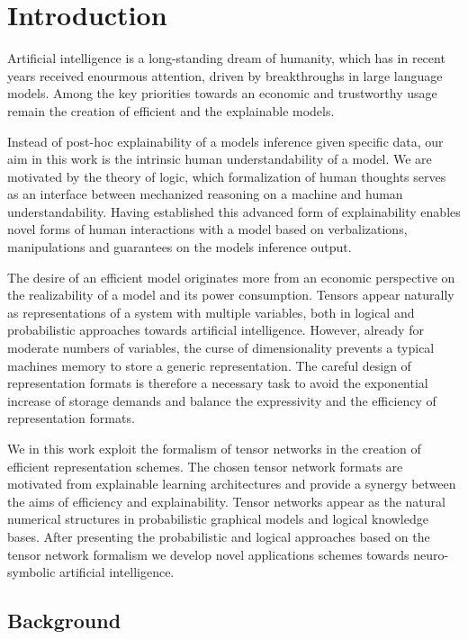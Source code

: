 \section{Introduction}

Artificial intelligence is a long-standing dream of humanity, which has in recent years received enourmous attention, driven by breakthroughs in large language models.
Among the key priorities towards an economic and trustworthy usage remain the creation of efficient and the explainable models.

Instead of post-hoc explainability of a models inference given specific data, our aim in this work is the intrinsic human understandability of a model.
We are motivated by the theory of logic, which formalization of human thoughts serves as an interface between mechanized reasoning on a machine and human understandability.
Having established this advanced form of explainability enables novel forms of human interactions with a model based on verbalizations, manipulations and guarantees on the models inference output.

The desire of an efficient model originates more from an economic perspective on the realizability of a model and its power consumption.
Tensors appear naturally as representations of a system with multiple variables, both in logical and probabilistic approaches towards artificial intelligence. %
However, already for moderate numbers of variables, the curse of dimensionality prevents a typical machines memory to store a generic representation.
The careful design of representation formats is therefore a necessary task to avoid the exponential increase of storage demands and balance the expressivity and the efficiency of representation formats.

We in this work exploit the formalism of tensor networks in the creation of efficient representation schemes.
The chosen tensor network formats are motivated from explainable learning architectures and provide a synergy between the aims of efficiency and explainability.
Tensor networks appear as the natural numerical structures in probabilistic graphical models and logical knowledge bases.
After presenting the probabilistic and logical approaches based on the tensor network formalism we develop novel applications schemes towards neuro-symbolic artificial intelligence.

\subsection{Background}

